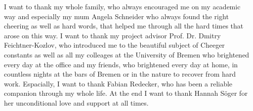 \documentclass[11pt,english,onehalfspacing,headsepline]{MastersDoctoralThesis}
\begin{document}

\begin{acknowledgements}
\addchaptertocentry{\acknowledgementname} %
I want to thank my whole family, who always encouraged me on my academic way and especially my mum Angela Schneider who always found the right cheering as well as hard words, that helped me through all the hard times that arose on this way. I want to thank my project advisor Prof. Dr. Dmitry Feichtner-Kozlov, who introduced me to the beautiful subject of Cheeger constants as well as all my colleages at the University of Bremen who brightened every day at the office and my friends, who brightened every day at home, in countless nights at the bars of Bremen or in the nature to recover from hard work. Espacially, I want to thank Fabian Redecker, who has been a reliable companion through my whole life. At the end I want to thank Hannah Söger for her unconditional love and support at all times.
\end{acknowledgements}


\tableofcontents %




\mainmatter %

\pagestyle{thesis} %



 

 

\end{document}
